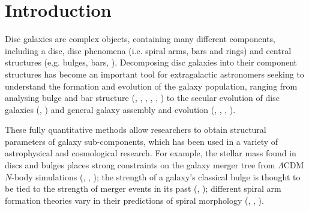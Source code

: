\documentclass[trackchanges]{aastex63}
\begin{document}
\section{Introduction}
\label{sec:introduction}

Disc galaxies are complex objects, containing many different components, including a disc, disc phenomena (i.e. spiral arms, bars and rings) and central structures (e.g. bulges, bars, ). Decomposing disc galaxies into their component structures has become an important tool for extragalactic astronomers seeking to understand the formation and evolution of the galaxy population, ranging from analysing bulge and bar structure (\citealt{1985ApJ...288..438E}, \citealt{1996A&AS..118..557D}, \citealt{2011MNRAS.415.3308G}, \citealt{Mendez-Abreu2016:1610.05324v1}, \citealt{Gao2017:1709.00746v1}, \citealt{2018MNRAS.473.4731K}) to the secular evolution of disc galaxies (\citealt{1998ApJ...500...75L}, \citealt{2005ApJ...635..959B}) and general galaxy assembly and evolution (\citealt{Simard2002:astro-ph/0205025v2}, \citealt{megamorph-paper}, \citealt{2012MNRAS.421.2277L}, \citealt{2019arXiv191002664R}).

These fully quantitative methods allow researchers to obtain structural parameters of galaxy sub-components, which has been used in a variety of astrophysical and cosmological research. For example, the stellar mass found in discs and bulges places strong constraints on the galaxy merger tree from $\Lambda$CDM $N$-body simulations (\citealt{2009MNRAS.396.1972P}, \citealt{Hopkins2010:1004.2708v3}, \citealt{2018MNRAS.475.5133R}); the strength of a galaxy's classical bulge is thought to be tied to the strength of merger events in its past (\citealt{2005ApJ...622L...9S}, \citealt{Kormendy2010:1009.3015v1}); different spiral arm formation theories vary in their predictions of spiral morphology (\citealt{Dobbs2014:1407.5062v1}, \citealt{Pour-Imani2016:1608.00969v1}, \citealt{2017MNRAS.472.2263H}).

\end{document}
